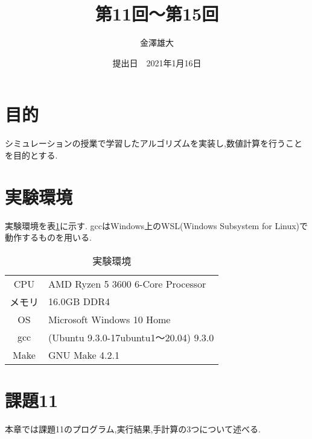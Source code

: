 \documentclass[a4j]{jarticle}
\title{第11回～第15回}
\date{提出日　2021年1月16日}
\author{金澤雄大}
\begin{document}
    \maketitle
    \thispagestyle{empty}
    \clearpage
    \addtocounter{page}{-1}
    \section{目的}
    シミュレーションの授業で学習したアルゴリズムを実装し,数値計算を行うことを目的とする.

    \section{実験環境}
      実験環境を表\ref{env}に示す. gccはWindows上のWSL(Windows Subsystem for Linux)で動作するものを用いる.
      \begin{table}[H]
        \caption{実験環境}
      \label{env}
      \begin{center}
          \begin{tabular}{c|l}\hline
            CPU & AMD Ryzen 5 3600 6-Core Processor \\ 
            メモリ & 16.0GB DDR4 \\
            OS & Microsoft Windows 10 Home \\
            gcc & (Ubuntu 9.3.0-17ubuntu1～20.04) 9.3.0 \\
            Make & GNU Make 4.2.1 \\ \hline
          \end{tabular}
      \end{center}
      \end{table}

      \section{課題11}
      本章では課題11のプログラム,実行結果,手計算の3つについて述べる.
\end{document}
